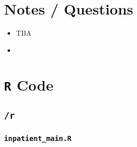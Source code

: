 \documentclass[
]{book}
\begin{document}
\hypertarget{notes-questions-1}{%
\section{Notes / Questions}\label{notes-questions-1}}

\begin{itemize}
\item
  TBA
\item
\end{itemize}

\hypertarget{r-code-1}{%
\section{\texorpdfstring{\texttt{R} Code}{R Code}}\label{r-code-1}}

\hypertarget{r-1}{%
\subsection{\texorpdfstring{\texttt{/r}}{/r}}\label{r-1}}

\hypertarget{inpatient_main.r}{%
\subsubsection{\texorpdfstring{\texttt{inpatient\_main.R}}{inpatient\_main.R}}\label{inpatient_main.r}}
\end{document}
